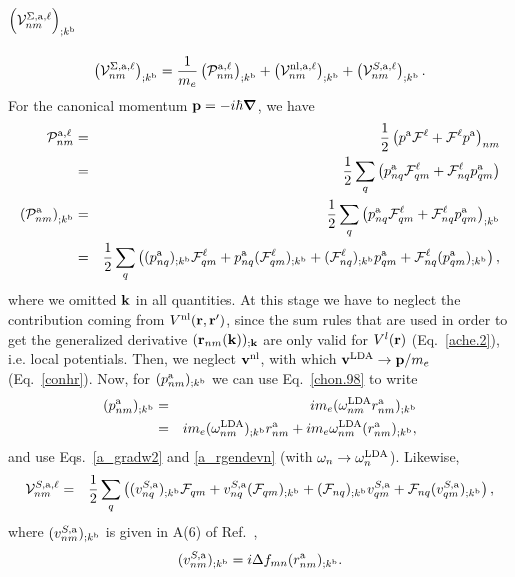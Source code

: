 \documentclass[floatfix,prb,aps,superscriptaddress,11pt,preprint]{revtex4}
\begin{document}
\section{$\Big({\cal V}^{\Sigma,\mathrm{a},\ell}_{nm}\Big)_{;k^{\mathrm{b}}}$}\label{calvs}
\begin{eqnarray}\label{a.1}
\left(
{\mathbf{\cal V}}^{\Sigma,\mathrm{a},\ell}_{nm}
\right)_{;k^{\mathrm{b}}}
=
\frac{1}{m_e}
\left(
{\mathbf{\cal P}}^{\mathrm{a},\ell}_{nm}
\right)_{;k^{\mathrm{b}}}
+
\left(
{\mathbf{\cal V}}^{\mathrm{nl},\mathrm{a},\ell}_{nm}
\right)_{;k^{\mathrm{b}}}
+
\left(
{\mathbf{\cal V}}^{S,\mathrm{a},\ell}_{nm}
\right)_{;k^{\mathrm{b}}}
.
\end{eqnarray}
For the canonical momentum $\mathbf{p}=-i\hbar\boldsymbol{\nabla}$, we have
\begin{eqnarray}\label{a.2}
{\mathbf{\cal P}}^{\mathrm{a},\ell}_{nm}
&=&
\frac{1}{2}\left(
p^{\mathrm{a}}{\mathbf{\cal F}}^\ell+{\mathbf{\cal F}}^\ell p^{\mathrm{a}}
\right)_{nm}
\nonumber\\
&=&
\frac{1}{2}\sum_q\left(
p^{\mathrm{a}}_{nq}{\mathbf{\cal F}}^\ell_{qm}+{\mathbf{\cal F}}^\ell_{nq} p_{qm}^{\mathrm{a}}
\right)
\nonumber\\
\left({\mathbf{\cal P}}^{\mathrm{a}}_{nm}\right)_{;k^{\mathrm{b}}}
&=&
\frac{1}{2}\sum_q\left(
p^{\mathrm{a}}_{nq}{\mathbf{\cal F}}^\ell_{qm}+{\mathbf{\cal F}}^\ell_{nq} p_{qm}^{\mathrm{a}}
\right) _{;k^{\mathrm{b}}}
\nonumber\\
&=&
\frac{1}{2}\sum_q\left(
(p^{\mathrm{a}}_{nq})_{;k^{\mathrm{b}}}{\mathbf{\cal F}}^\ell_{qm}
+ 
p^{\mathrm{a}}_{nq}({\mathbf{\cal F}}^\ell_{qm})_{;k^{\mathrm{b}}}
+
({\mathbf{\cal F}}^\ell_{nq})_{;k^{\mathrm{b}}} p_{qm}^{\mathrm{a}}
+
{\mathbf{\cal F}}^\ell_{nq} (p_{qm}^{\mathrm{a}})_{;k^{\mathrm{b}}}
\right)
,
\end{eqnarray} 
where we omitted $\mathbf{k}$ in all quantities.
At this stage we have to neglect the contribution coming from
$V^{\mathrm{nl}}(\mathbf{r},\mathbf{r}')$, since the sum rules that are used in order to get
the generalized derivative $(\mathbf{r}_{nm}(\mathbf{k}))_{;\mathbf{k}}$ are only valid
for $V^l(\mathbf{r})$ (Eq.~\eqref{ache.2}), i.e. local potentials.\cite{nastosPRB05}
Then, we neglect $\mathbf{v}^{\mathrm{nl}}$, with which $\mathbf{v}^{\mathrm{LDA}}\to\mathbf{p}/m_e$ (Eq.~\eqref{conhr}).
Now, for $(p^{\mathrm{a}}_{nm})_{;k^{\mathrm{b}}}$
we can use
Eq.~\eqref{chon.98} to write
\begin{eqnarray}\label{a.3}
(p^{\mathrm{a}}_{nm})_{;k^{\mathrm{b}}}
&=& 
im_e(\omega^{\mathrm{LDA}}_{nm}r^{\mathrm{a}}_{nm})_{;k^{\mathrm{b}}}
\nonumber\\
&=& 
im_e(\omega^{\mathrm{LDA}}_{nm})_{;k^{\mathrm{b}}} r^{\mathrm{a}}_{nm}
+ 
im_e\omega^{\mathrm{LDA}}_{nm}(r^{\mathrm{a}}_{nm})_{;k^{\mathrm{b}}}
,
\end{eqnarray} 
and use Eqs.~\eqref{a_gradw2} and \eqref{a_rgendevn} (with
$\omega_n\to\omega_n^{\mathrm{LDA}}$).
Likewise,
\begin{eqnarray}\label{a.3}
{\mathbf{\cal V}}^{S,\mathrm{a},\ell}_{nm}
&=&
\frac{1}{2}\sum_q\left(
(v^{S,\mathrm{a}}_{nq})_{;k^{\mathrm{b}}}{\mathbf{\cal F}}_{qm}
+
v^{S,\mathrm{a}}_{nq}({\mathbf{\cal F}}_{qm})_{;k^{\mathrm{b}}}
+
({\mathbf{\cal F}}_{nq})_{;k^{\mathrm{b}}} v_{qm}^{S,\mathrm{a}}
+
{\mathbf{\cal F}}_{nq} (v_{qm}^{S,\mathrm{a}})_{;k^{\mathrm{b}}}
\right)
,
\end{eqnarray}
where $(v^{S,\mathrm{a}}_{nm})_{;k^{\mathrm{b}}}$ is given in A(6) of
Ref.~,
\begin{eqnarray}\label{choni.1}
(v^{S,\mathrm{a}}_{nm})_{;k^{\mathrm{b}}}=i\Delta f_{mn}
(r^{\mathrm{a}}_{nm})_{;k^{\mathrm{b}}}
.
\end{eqnarray}
\end{document}
